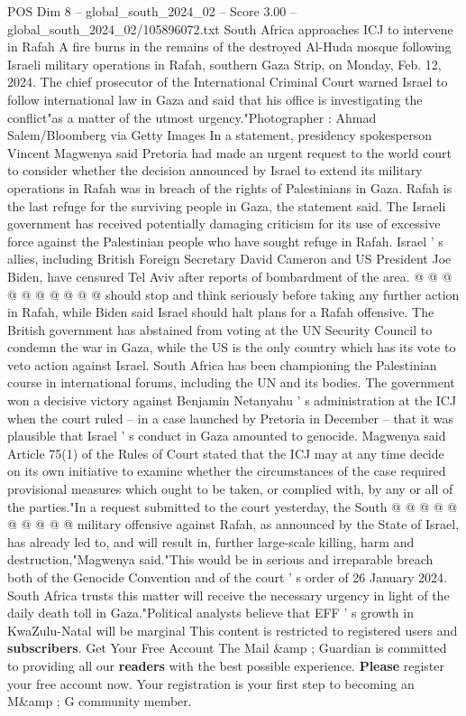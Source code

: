 \begin{textsample}{POS Dim 8 – global\_south\_2024\_02 – Score 3.00 – global\_south\_2024\_02/105896072.txt}  \label{ex:f8_pos_382}
South Africa approaches ICJ to intervene in Rafah A fire burns in the remains of the destroyed Al-Huda mosque following Israeli military operations in Rafah, southern Gaza Strip, on Monday, Feb. 12, 2024.
The chief prosecutor of the International Criminal Court warned Israel to follow international law in Gaza and said that his office is investigating the conflict"as a matter of the utmost urgency."Photographer : Ahmad Salem/Bloomberg via Getty Images In a statement, presidency spokesperson Vincent Magwenya said Pretoria had made an urgent request to the world court to consider whether the decision announced by Israel to extend its military operations in Rafah was in breach of the rights of Palestinians in Gaza.
Rafah is the last refuge for the surviving people in Gaza, the statement said.
The Israeli government has received potentially damaging criticism for its use of excessive force against the Palestinian people who have sought refuge in Rafah.
Israel ' s allies, including British Foreign Secretary David Cameron and US President Joe Biden, have censured Tel Aviv after reports of bombardment of the area. @ @ @ @ @ @ @ @ @ @ should stop and think seriously before taking any further action in Rafah, while Biden said Israel should halt plans for a Rafah offensive.
The British government has abstained from voting at the UN Security Council to condemn the war in Gaza, while the US is the only country which has its vote to veto action against Israel.
South Africa has been championing the Palestinian course in international forums, including the UN and its bodies.
The government won a decisive victory against Benjamin Netanyahu ' s administration at the ICJ when the court ruled -- in a case launched by Pretoria in December -- that it was plausible that Israel ' s conduct in Gaza amounted to genocide.
Magwenya said Article 75(1) of the Rules of Court stated that the ICJ may at any time decide on its own initiative to examine whether the circumstances of the case required provisional measures which ought to be taken, or complied with, by any or all of the parties."In a request submitted to the court yesterday, the South @ @ @ @ @ @ @ @ @ @ military offensive against Rafah, as announced by the State of Israel, has already led to, and will result in, further large-scale killing, harm and destruction,"Magwenya said."This would be in serious and irreparable breach both of the Genocide Convention and of the court ' s order of 26 January 2024.
South Africa trusts this matter will receive the necessary urgency in light of the daily death toll in Gaza."Political analysts believe that EFF ' s growth in KwaZulu-Natal will be marginal This content is restricted to registered users and \textbf{subscribers}.
Get Your Free Account The Mail \&amp ; Guardian is committed to providing all our \textbf{readers} with the best possible experience. \textbf{Please} register your free account now.
Your registration is your first step to becoming an M\&amp ; G community member.

\end{textsample}

